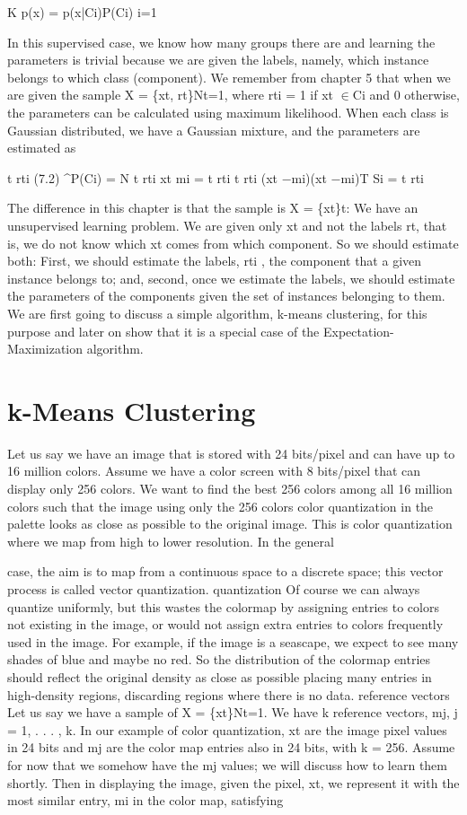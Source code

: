 K p(x) = p(x|Ci)P(Ci) i=1

In this supervised case, we know how many groups there are and learning the parameters is trivial because we are given the labels, namely, which instance belongs to which class (component). We remember from chapter 5 that when we are given the sample X = \{xt, rt\}Nt=1, where rti = 1 if xt $\in$Ci and 0 otherwise, the parameters can be calculated using maximum likelihood. When each class is Gaussian distributed, we have a Gaussian mixture, and the parameters are estimated as

t rti (7.2) \textasciicircum{}P(Ci) = N t rti xt mi = t rti t rti (xt $-$mi)(xt $-$mi)T Si = t rti

The difference in this chapter is that the sample is X = \{xt\}t: We have an unsupervised learning problem. We are given only xt and not the labels rt, that is, we do not know which xt comes from which component. So we should estimate both: First, we should estimate the labels, rti , the component that a given instance belongs to; and, second, once we estimate the labels, we should estimate the parameters of the components given the set of instances belonging to them. We are first going to discuss a simple algorithm, k-means clustering, for this purpose and later on show that it is a special case of the Expectation-Maximization algorithm.

\section{k-Means Clustering}

Let us say we have an image that is stored with 24 bits/pixel and can have up to 16 million colors. Assume we have a color screen with 8 bits/pixel that can display only 256 colors. We want to find the best 256 colors among all 16 million colors such that the image using only the 256 colors color quantization in the palette looks as close as possible to the original image. This is color quantization where we map from high to lower resolution. In the general

case, the aim is to map from a continuous space to a discrete space; this vector process is called vector quantization. quantization Of course we can always quantize uniformly, but this wastes the colormap by assigning entries to colors not existing in the image, or would not assign extra entries to colors frequently used in the image. For example, if the image is a seascape, we expect to see many shades of blue and maybe no red. So the distribution of the colormap entries should reflect the original density as close as possible placing many entries in high-density regions, discarding regions where there is no data. reference vectors Let us say we have a sample of X = \{xt\}Nt=1. We have k reference vectors, mj, j = 1, . . . , k. In our example of color quantization, xt are the image pixel values in 24 bits and mj are the color map entries also in 24 bits, with k = 256. Assume for now that we somehow have the mj values; we will discuss how to learn them shortly. Then in displaying the image, given the pixel, xt, we represent it with the most similar entry, mi in the color map, satisfying

